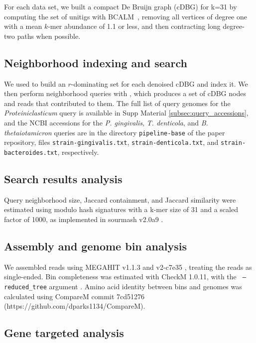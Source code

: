 For each data set, we built a compact De Bruijn graph (cDBG) for
k=31 by computing the set of unitigs with
BCALM~\cite{chikhi2016compacting}, removing all vertices of degree one
with a mean $k$-mer abundance of 1.1 or less, and then contracting
long degree-two paths when possible.

\subsection*{Neighborhood indexing and search}

We used \sgc to build an $r$-dominating set for each denoised cDBG and
index it. We then perform neighborhood queries with \sgc, which
produces a set of cDBG nodes and reads that contributed to them.  The
full list of query genomes for the {\em Proteiniclasticum} query is
  available in Supp Material \ref{subsec:query_accessions}, and
  the NCBI accessions for the {\em P. gingivalis}, {\em T. denticola}, 
and {\em B. thetaiotamicron} queries are in the directory {\tt pipeline-base} 
of the paper repository, files {\tt strain-gingivalis.txt}, 
{\tt strain-denticola.txt}, and {\tt strain-bacteroides.txt}, respectively.

\subsection*{Search results analysis}

Query neighborhood size, Jaccard containment, and Jaccard similarity
were estimated using modulo hash signatures with a k-mer size of 31 and
a scaled factor of 1000, as implemented in sourmash v2.0a9
\cite{sourmash}.

\subsection*{Assembly and genome bin analysis}

We assembled reads using MEGAHIT v1.1.3 \cite{megahit} and \plass
v2-c7e35 \cite{plass}, treating the reads as single-ended. Bin
completeness was estimated with CheckM 1.0.11, with the {\tt
  --reduced\_tree} argument \cite{CheckM}.  Amino acid identity
between bins and genomes was calculated using CompareM commit
7cd51276 (https://github.com/dparks1134/CompareM).

\subsection*{Gene targeted analysis}

